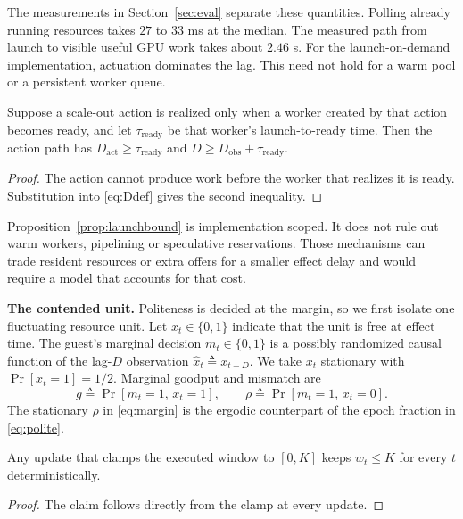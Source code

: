 The measurements in Section~\ref{sec:eval} separate these quantities. Polling
already running resources takes $27$ to $33$ ms at the median. The measured path
from launch to visible useful GPU work takes about $2.46$ s. For the
launch-on-demand implementation, actuation dominates the lag. This need not hold
for a warm pool or a persistent worker queue.

\begin{proposition}
\label{prop:launchbound}
Suppose a scale-out action is realized only when a worker created by that action
becomes ready, and let $\tau_{\mathrm{ready}}$ be that worker's launch-to-ready
time. Then the action path has
$D_{\mathrm{act}}\ge\tau_{\mathrm{ready}}$ and
$D\ge D_{\mathrm{obs}}+\tau_{\mathrm{ready}}$.
\end{proposition}
\begin{proof}
The action cannot produce work before the worker that realizes it is ready.
Substitution into \eqref{eq:Ddef} gives the second inequality.
\end{proof}
Proposition~\ref{prop:launchbound} is implementation scoped. It does not rule out
warm workers, pipelining or speculative reservations. Those mechanisms can trade
resident resources or extra offers for a smaller effect delay and would require
a model that accounts for that cost.

\noindent\textbf{The contended unit.}
Politeness is decided at the margin, so we first isolate one fluctuating resource
unit. Let $x_t\in\{0,1\}$ indicate that the unit is free at effect time. The
guest's marginal decision $m_t\in\{0,1\}$ is a possibly randomized causal
function of the lag-$D$ observation
$\hat x_t\triangleq x_{t-D}$. We take $x_t$ stationary with
$\Pr[x_t=1]=1/2$. Marginal goodput and mismatch are
\begin{equation}\label{eq:margin}
g \triangleq \Pr[m_t=1,\,x_t=1],\qquad
\rho \triangleq \Pr[m_t=1,\,x_t=0].
\end{equation}
The stationary $\rho$ in \eqref{eq:margin} is the ergodic counterpart of the
epoch fraction in \eqref{eq:polite}.

\begin{proposition}\label{prop:safety}
Any update that clamps the executed window to $[0,K]$ keeps $w_t\le K$ for every
$t$ deterministically.
\end{proposition}
\begin{proof}
The claim follows directly from the clamp at every update.
\end{proof}

